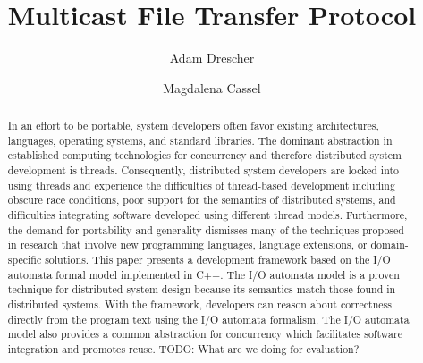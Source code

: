 \documentclass[letterpaper]{article}
\begin{document}
\title{Multicast File Transfer Protocol}
\author{Adam Drescher \and Magdalena Cassel}
\date{}

\maketitle

\begin{abstract}
In an effort to be portable, system developers often favor existing architectures, languages, operating systems, and standard libraries.
The dominant abstraction in established computing technologies for concurrency and therefore distributed system development is threads.
Consequently, distributed system developers are locked into using threads and experience the difficulties of thread-based development including obscure race conditions, poor support for the semantics of distributed systems, and difficulties integrating software developed using different thread models.
Furthermore, the demand for portability and generality dismisses many of the techniques proposed in research that involve new programming languages, language extensions, or domain-specific solutions.
This paper presents a development framework based on the I/O automata formal model implemented in C++.
The I/O automata model is a proven technique for distributed system design because its semantics match those found in distributed systems.
With the framework, developers can reason about correctness directly from the program text using the I/O automata formalism.
The I/O  automata model also provides a common abstraction for concurrency which facilitates software integration and promotes reuse.
TODO:  What are we doing for evaluation?
\end{abstract}
\end{document}
